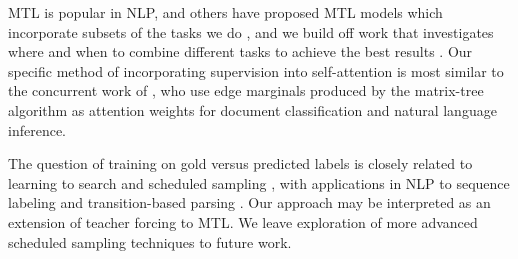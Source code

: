 \documentclass[11pt,a4paper]{article}
\begin{document}
MTL \citep{caruana1993multitask} is popular in NLP, and others have proposed MTL models which incorporate subsets of the tasks we do \citep{collobert2011natural, zhang2016stack, hashimoto2017joint, peng2017deep, swayamdipta2017}, and we build off work that investigates where and when to combine different tasks to achieve the best results \citep{sogaard2016deep, bingel2017identifying, alonso2017when}. Our specific method of incorporating supervision into self-attention is most similar to the concurrent work of \citet{liu2018learning}, who use edge marginals produced by the matrix-tree algorithm as attention weights for document classification and natural language inference.


The question of training on gold versus predicted labels is closely related to learning to search \citep{daume2009search,ross2011reduction,chang2015learning} and scheduled sampling \citep{bengio2015scheduled}, with applications in NLP to sequence labeling and transition-based parsing \citep{choi2011getting, goldberg2012dynamic,ballesteros2016training}. Our approach may be interpreted as an extension of teacher forcing \citep{williams1989learning} to MTL. We leave exploration of more advanced scheduled sampling techniques to future work. 
\end{document}
